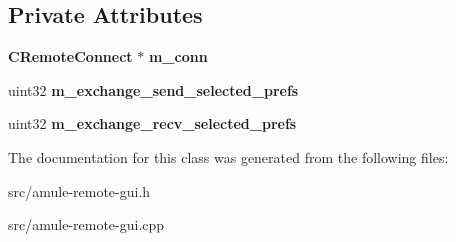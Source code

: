 \subsection*{Private Attributes}
\begin{DoxyCompactItemize}
\item 
{\bf CRemoteConnect} $\ast$ {\bfseries m\_\-conn}\label{classCPreferencesRem_a6ad1d472f369a03ee0c8c9699f496426}

\item 
uint32 {\bfseries m\_\-exchange\_\-send\_\-selected\_\-prefs}\label{classCPreferencesRem_a6253938d4acd457bdfcac36a418818ce}

\item 
uint32 {\bfseries m\_\-exchange\_\-recv\_\-selected\_\-prefs}\label{classCPreferencesRem_ae75c701716cf106d5763bebaccbc5884}

\end{DoxyCompactItemize}


The documentation for this class was generated from the following files:\begin{DoxyCompactItemize}
\item 
src/amule-\/remote-\/gui.h\item 
src/amule-\/remote-\/gui.cpp\end{DoxyCompactItemize}
